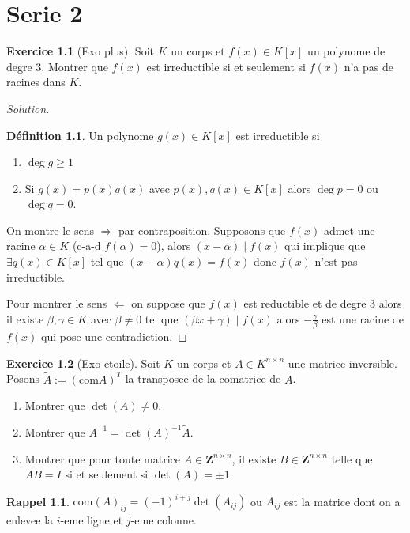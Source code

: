 \documentclass[a4paper,11pt,french]{report}
\theoremstyle{plain}
\theoremstyle{definition}
\newtheorem{definition}{Définition}[chapter]
\newtheorem*{reminder}{Rappel}
\newtheorem{exercise}{Exercice}[chapter]
\begin{document}
\chapter{Serie 2}
\begin{exercise}[Exo plus]
Soit $K$ un corps et $f(x)\in K[x]$ un polynome de degre 3. Montrer que $f(x)$ est irreductible si et seulement si $f(x)$ n'a pas de racines dans $K$.
\end{exercise}
\begin{proof}[Solution]
\begin{definition}
Un polynome $g(x)\in K[x]$ est irreductible si
\begin{enumerate}
\item $\deg g\ge 1$
\item Si $g(x)=p(x)q(x)$ avec $p(x),q(x)\in K[x]$ alors $\deg p=0$ ou $\deg q=0$.
\end{enumerate}
\end{definition}
On montre le sens $\Rightarrow$ par contraposition. Supposons que $f(x)$ admet une racine $\alpha \in K$ (c-a-d $f(\alpha)=0$), alors $(x-\alpha)\mid f(x)$ qui implique que $\exists q(x)\in K[x]$ tel que $(x-\alpha)q(x)=f(x)$ donc $f(x)$ n'est pas irreductible.

Pour montrer le sens $\Leftarrow$ on suppose que $f(x)$ est reductible et de degre 3 alors il existe $\beta,\gamma \in K$ avec $\beta\neq 0$ tel que $(\beta x+\gamma)\mid f(x)$ alors $-\frac{\gamma}{\beta}$ est une racine de $f(x)$ qui pose une contradiction.
\end{proof}
\begin{exercise}[Exo etoile]
Soit $K$ un corps et $A\in K^{n\times n}$ une matrice inversible. Posons $\tilde{A}:=(\mathrm{com}A)^{T}$ la transposee de la comatrice de $A$.
\begin{enumerate}
\item Montrer que $\det(A)\neq 0$.
\item Montrer que $A^{-1}=\det(A)^{-1}\tilde{A}$.
\item Montrer que pour toute matrice $A\in \mathbf{Z}^{n\times n}$, il existe $B\in \mathbf{Z}^{n\times n}$ telle que $AB=I$ si et seulement si $\det(A)=\pm1$.
\end{enumerate}
\begin{reminder}
$\mathrm{com}(A)_{ij}=(-1)^{i+j}\det(A_{ij})$ ou $A_{ij}$ est la matrice dont on a enlevee la $i$-eme ligne et $j$-eme colonne.
\end{reminder}
\end{exercise}
\end{document}
